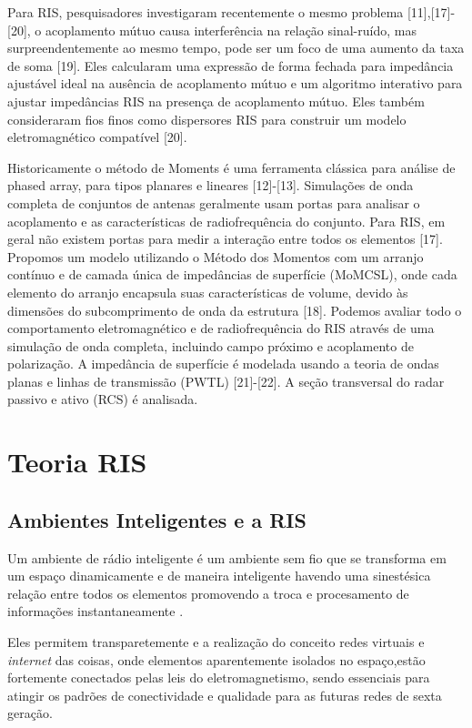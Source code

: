 \documentclass[
	12pt,				%
	openright,			%
	oneside,			%
	a4paper,			%
	english,			%
	brazil				%
	]{abntex2}
\begin{document}
Para RIS, pesquisadores investigaram recentemente o mesmo problema [11],[17]-[20], o acoplamento mútuo causa interferência na relação sinal-ruído, mas surpreendentemente ao mesmo tempo, pode ser um foco de uma aumento da taxa de soma [19]. Eles calcularam uma expressão de forma fechada para impedância ajustável ideal na ausência de acoplamento mútuo e um algoritmo interativo para ajustar impedâncias RIS na presença de acoplamento mútuo. Eles também consideraram fios finos como dispersores RIS para construir um modelo eletromagnético compatível [20].

Historicamente o método de Moments é uma ferramenta clássica para análise de phased array, para tipos planares e lineares [12]-[13]. Simulações de onda completa de conjuntos de antenas geralmente usam portas para analisar o acoplamento e as características de radiofrequência do conjunto. Para RIS, em geral não existem portas para medir a interação entre todos os elementos [17]. Propomos um modelo utilizando o Método dos Momentos com um arranjo contínuo e de camada única de impedâncias de superfície (MoMCSL), onde cada elemento do arranjo encapsula suas características de volume, devido às dimensões do subcomprimento de onda da estrutura [18]. Podemos avaliar todo o comportamento eletromagnético e de radiofrequência do RIS através de uma simulação de onda completa, incluindo campo próximo e acoplamento de polarização. A impedância de superfície é modelada usando a teoria de ondas planas e linhas de transmissão (PWTL) [21]-[22]. A seção transversal do radar passivo e ativo (RCS) é analisada.


\chapter{Teoria RIS} 

\section{Ambientes Inteligentes e a RIS} 

Um ambiente de rádio inteligente é um ambiente sem fio que se transforma em um espaço dinamicamente e de maneira inteligente havendo uma sinestésica relação entre todos os elementos promovendo a troca e procesamento  de informações instantaneamente \cite{ProgrammableEnvironment}. 

Eles permitem transparetemente e a realização do conceito redes virtuais e  \textit{internet} das coisas, onde elementos aparentemente isolados no espaço,estão fortemente conectados pelas leis do eletromagnetismo, sendo essenciais para atingir os padrões de conectividade e qualidade para as futuras redes de sexta geração.\cite{5GPPP}
\end{document}
